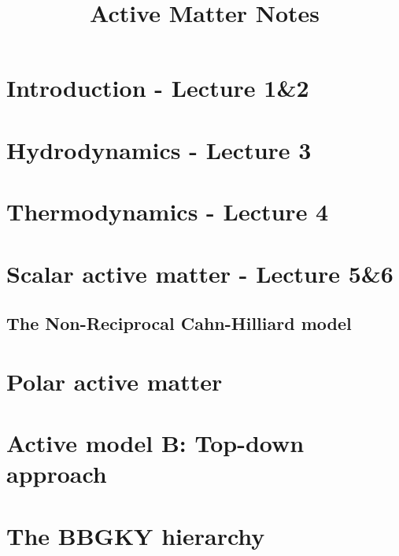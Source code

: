 \documentclass[10pt, a4paper, oneside]{book}
\title{Active Matter Notes}
\begin{document}
    \maketitle
    \clearpage


    \tableofcontents
    \clearpage

    \setlength{\parindent}{0em}
    \setlength{\parskip}{0.8em}


    \chapter{Introduction - Lecture 1\&2}
    

    \chapter{Hydrodynamics - Lecture 3}
    

    \chapter{Thermodynamics - Lecture 4}
     

    \chapter{Scalar active matter - Lecture 5\&6}
    

    \section{The Non-Reciprocal Cahn-Hilliard model}
    

    \chapter{Polar active matter}
    

    \appendix

    \chapter{Active model B: Top-down approach}
    

    \chapter{The BBGKY hierarchy}
    
\end{document}
